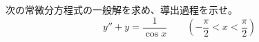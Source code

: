
次の常微分方程式の一般解を求め、導出過程を示せ。
\[
y'' + y = \frac{1}{\cos x} \qquad \left(-\frac{\pi}{2} < x < \frac{\pi}{2}\right)
\]
